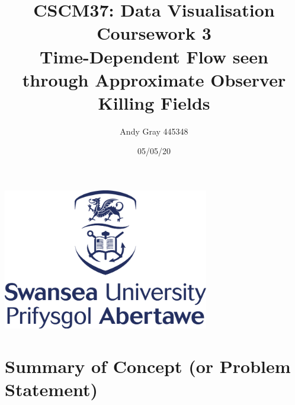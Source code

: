 \documentclass[a4paper,9pt]{article}
\begin{document}
\title{\textbf{CSCM37: Data Visualisation \\Coursework 3\\Time-Dependent Flow seen through Approximate Observer Killing Fields \cite{papertitle}}}
\author{Andy Gray 445348\\}
\date{05/05/20}



\maketitle
\begin{center}
	\item\includegraphics[width=9cm]{swansea.png}
\end{center}

\thispagestyle{empty}
\newpage
{}

\setlength{\topmargin}{-0.7in} 

\section{Summary of Concept (or Problem Statement)}
\end{document}
